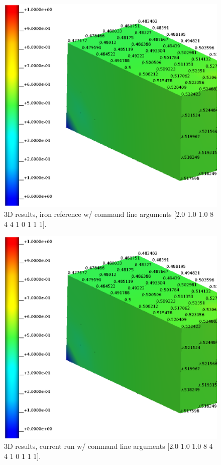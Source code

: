 %
\begin{figure}[h!]
    \centering 
    \includegraphics[width=0.9\columnwidth]{examples/example-0011/doc/figures/iron_reference_3D.eps} 
    \caption{3D results, iron reference w/ command line arguments [2.0 1.0 1.0 8 4 4 1 0 1 1 1].}
    \label{example-0011-iron-3D-reference-fig}
\end{figure}
%
\begin{figure}[h!]
    \centering 
    \includegraphics[width=0.9\columnwidth]{examples/example-0011/doc/figures/current_run_l2x1x1_n8x4x4_i1_s0.eps} 
    \caption{3D results, current run w/ command line arguments [2.0 1.0 1.0 8 4 4 1 0 1 1 1].}
    \label{example-0011-current-run-3D-fig}
\end{figure}
%

